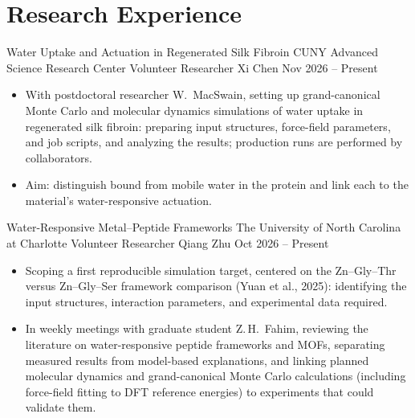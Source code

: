 
\section{Research Experience}

\researchentry
  {Water Uptake and Actuation in Regenerated Silk Fibroin}
  {CUNY Advanced Science Research Center}
  {Volunteer Researcher}
  {Xi Chen}
  {Nov 2026 -- Present}
  {}
\begin{itemize}[leftmargin=1em,label={--},itemsep=2pt,topsep=0pt,parsep=0pt,partopsep=0pt]
  \item With postdoctoral researcher W.~MacSwain, setting up grand-canonical
  Monte Carlo and molecular dynamics simulations of water uptake in regenerated
  silk fibroin: preparing input structures, force-field parameters, and job
  scripts, and analyzing the results; production runs are performed by
  collaborators.
  \item Aim: distinguish bound from mobile water in the protein and link each
  to the material's water-responsive actuation.
\end{itemize}

\vspace{0.2em}

\researchentry
  {Water-Responsive Metal--Peptide Frameworks}
  {The University of North Carolina at Charlotte}
  {Volunteer Researcher}
  {Qiang Zhu}
  {Oct 2026 -- Present}
  {}
\begin{itemize}[
  leftmargin=1em,
  label={--},
  itemsep=2pt,
  topsep=0pt,
  parsep=0pt,
  partopsep=0pt
]
  \item Scoping a first reproducible simulation target, centered on the
  Zn--Gly--Thr versus Zn--Gly--Ser framework comparison (Yuan et al., 2025):
  identifying the input structures, interaction parameters, and experimental
  data required.

  \item In weekly meetings with graduate student Z.\,H.~Fahim, reviewing the
  literature on water-responsive peptide frameworks and MOFs, separating
  measured results from model-based explanations, and linking planned
  molecular dynamics and grand-canonical Monte Carlo calculations (including
  force-field fitting to DFT reference energies) to experiments that could
  validate them.
\end{itemize}

